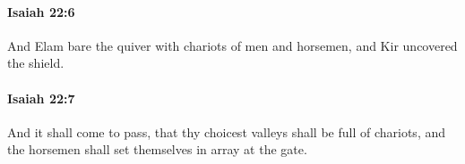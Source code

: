 		\paragraph{Isaiah 22:6} %
			\label{ISAIAH-22-6}

			And Elam bare the quiver with chariots of men and horsemen, and Kir uncovered the shield.


		\paragraph{Isaiah 22:7} %
			\label{ISAIAH-22-7}

			And it shall come to pass, that thy choicest valleys shall be full of chariots, and the horsemen shall set themselves in array at the gate.


